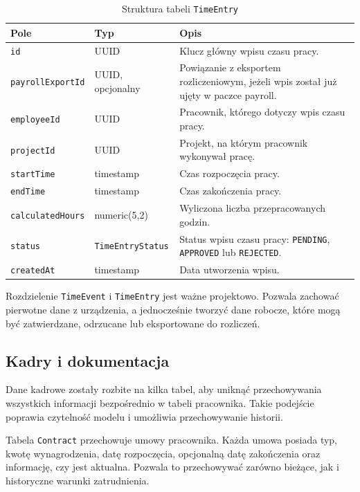 \begin{table}[H]
\centering
\renewcommand{\arraystretch}{1.25}
\begin{tabular}{|p{}|p{}|p{}|}
\hline
\textbf{Pole} & \textbf{Typ} & \textbf{Opis} \\ \hline
\texttt{id} & UUID & Klucz główny wpisu czasu pracy. \\ \hline
\texttt{payrollExportId} & UUID, opcjonalny & Powiązanie z eksportem rozliczeniowym, jeżeli wpis został już ujęty w paczce payroll. \\ \hline
\texttt{employeeId} & UUID & Pracownik, którego dotyczy wpis czasu pracy. \\ \hline
\texttt{projectId} & UUID & Projekt, na którym pracownik wykonywał pracę. \\ \hline
\texttt{startTime} & timestamp & Czas rozpoczęcia pracy. \\ \hline
\texttt{endTime} & timestamp & Czas zakończenia pracy. \\ \hline
\texttt{calculatedHours} & numeric(5,2) & Wyliczona liczba przepracowanych godzin. \\ \hline
\texttt{status} & \texttt{TimeEntryStatus} & Status wpisu czasu pracy: \texttt{PENDING}, \texttt{APPROVED} lub \texttt{REJECTED}. \\ \hline
\texttt{createdAt} & timestamp & Data utworzenia wpisu. \\ \hline
\end{tabular}
\caption{Struktura tabeli \texttt{TimeEntry}}
\label{tab:timeentry_struct}
\end{table}

Rozdzielenie \texttt{TimeEvent} i \texttt{TimeEntry} jest ważne projektowo. Pozwala zachować pierwotne dane z urządzenia, a jednocześnie tworzyć dane robocze, które mogą być zatwierdzane, odrzucane lub eksportowane do rozliczeń.

\subsection{Kadry i dokumentacja}

Dane kadrowe zostały rozbite na kilka tabel, aby uniknąć przechowywania wszystkich informacji bezpośrednio w tabeli pracownika. Takie podejście poprawia czytelność modelu i umożliwia przechowywanie historii.

Tabela \texttt{Contract} przechowuje umowy pracownika. Każda umowa posiada typ, kwotę wynagrodzenia, datę rozpoczęcia, opcjonalną datę zakończenia oraz informację, czy jest aktualna. Pozwala to przechowywać zarówno bieżące, jak i historyczne warunki zatrudnienia.

